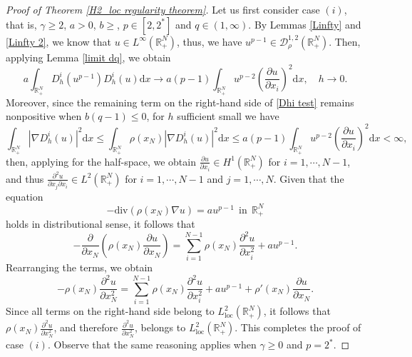 \documentclass[12pt,reqno]{amsart}
\begin{document}
\begin{proof}[Proof of Theorem \ref{H2_loc regularity theorem}]
Let us first consider case $(i)$, that is, $\gamma\geq2$, $a>0$, $b\geq$, $p\in [2,2^\ast]$ and $q\in (1,\infty)$. By Lemmas \ref{Linfty} and \ref{Linfty 2}, we know that $u\in L^\infty(\mathds{R}^N_+)$, thus, we have $u^{p-1} \in \mathcal{D}^{1,2}_\rho(\mathds{R}^N_+)$. Then, applying Lemma \ref{limit dq}, we obtain
\[
a\int_{\mathds{R}^N_+}D_h^i(u^{p-1})D_h^i(u)\mathrm{d}x \longrightarrow a(p-1) \int_{\mathds{R}^N_+}u^{p-2}\left(\frac{\partial u}{\partial x_i}\right)^2\mathrm{d}x, \quad  h \longrightarrow 0.
\]
Moreover, since the remaining term on the right-hand side of \eqref{Dhi test} remains nonpositive when $b(q-1)\leq 0$, for $h$ sufficient small we have
\begin{equation*}
    \int_{\mathds{R}^N_+}|\nabla D_h^i(u)|^2 \mathrm{d}x\leq\int_{\mathds{R}^N_+}\rho(x_N)|\nabla D_h^i(u)|^2 \mathrm{d}x\leq a(p-1) \int_{\mathds{R}^N_+}u^{p-2}\left(\frac{\partial u}{\partial x_i}\right)^2\mathrm{d}x<\infty,
\end{equation*}
then, applying \cite[Proposition 9.3]{Brezis} for the half-space, we obtain $\frac{\partial u}{\partial x_i} \in H^1(\mathds{R}^N_+)$ for $i=1,\cdots,N-1$, and thus $\frac{\partial^2u}{\partial x_j\partial x_i} \in L^2(\mathds{R}^N_+)$ for $i=1,\cdots, N-1$ and $j=1,\cdots, N$. Given that the equation
\begin{equation*}
    -\mathrm{div}(\rho(x_N)\nabla u)=au^{p-1}~~\text{in}~~ \mathds{R}^N_+
\end{equation*}
holds in distributional sense, it follows that
\begin{equation*}
   - \frac{\partial}{\partial x_N}\left(\rho(x_N)\frac{\partial u}{\partial x_N}\right)= \sum_{i=1}^{N-1}\rho(x_N)\frac{\partial^2u}{\partial x_i^2}+au^{p-1}.
\end{equation*}
Rearranging the terms, we obtain
\begin{equation*}
    -\rho(x_N)\frac{\partial^2u}{\partial x_N^2}= \sum_{i=1}^{N-1}\rho(x_N)\frac{\partial^2u}{\partial x_i^2}+au^{p-1}+\rho'(x_N)\frac{\partial u}{\partial x_N}.
\end{equation*}
Since all terms on the right-hand side belong to $L^2_{\mathrm{loc}}(\mathds{R}^N_+)$, it follows that $\rho(x_N)\frac{\partial^2u}{\partial x_N^2}$, and therefore $\frac{\partial^2u}{\partial x_N^2}$, belongs to $L^2_{\mathrm{loc}}(\mathds{R}^N_+)$. This completes the proof of case $(i)$. Observe that the same reasoning applies when $\gamma\geq 0$ and $p=2^\ast$.

 


\end{proof}
\end{document}

